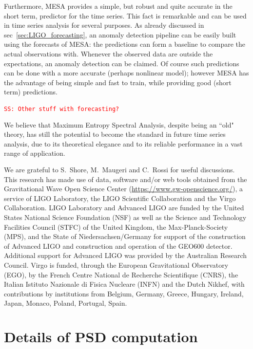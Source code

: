 \documentclass[twocolumn,showpacs,preprintnumbers,nofootinbib,prd,
superscriptaddress,10pt]{revtex4-1}
\newcommand{\sschmidt}[1]{{\textcolor{red}{\texttt{SS: #1}} }}
\begin{document}
Furthermore, MESA provides a simple, but robust and quite accurate in the short term, predictor for the time series. This fact is remarkable and can be used in time series analysis for several purposes.
As already discussed in sec~\ref{sec:LIGO_forecasting}, an anomaly detection pipeline can be easily built using the forecasts of MESA: the predictions can form a baseline to compare the actual observations with. Whenever the observed data are outside the expectations, an anomaly detection can be claimed.
Of course such predictions can be done with a more accurate (perhaps nonlinear model); however MESA has the advantage of being simple and fast to train, while providing good (short term) predictions.

\sschmidt{Other stuff with forecasting?}

We believe that Maximum Entropy Spectral Analysis, despite being an ``old" theory, has still the potential to become the standard in future time series analysis, due to its theoretical elegance and to its reliable performance in a vast range of application.



\begin{acknowledgments}
We are grateful to S.~Shore, M.~Maugeri and C.~Rossi for useful discussions.\\
This research has made use of data, software and/or web tools obtained from the Gravitational Wave Open Science Center (\url{https://www.gw-openscience.org/}), a service of LIGO Laboratory, the LIGO Scientific Collaboration and the Virgo Collaboration. LIGO Laboratory and Advanced LIGO are funded by the United States National Science Foundation (NSF) as well as the Science and Technology Facilities Council (STFC) of the United Kingdom, the Max-Planck-Society (MPS), and the State of Niedersachsen/Germany for support of the construction of Advanced LIGO and construction and operation of the GEO600 detector. Additional support for Advanced LIGO was provided by the Australian Research Council. Virgo is funded, through the European Gravitational Observatory (EGO), by the French Centre National de Recherche Scientifique (CNRS), the Italian Istituto Nazionale di Fisica Nucleare (INFN) and the Dutch Nikhef, with contributions by institutions from Belgium, Germany, Greece, Hungary, Ireland, Japan, Monaco, Poland, Portugal, Spain.
\end{acknowledgments}

\pagebreak
\appendix
\section{Details of PSD computation} \label{sec:appendix}
\end{document}
